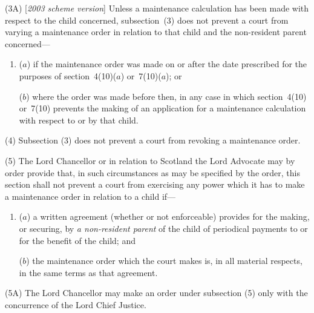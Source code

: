 \documentclass[12pt,a4paper]{article}
\begin{document}
(3A) [\emph{2003 scheme version}] Unless a maintenance calculation has been made with respect to the child concerned, subsection~(3)  does not prevent a court from varying a maintenance order in relation to that child and the non-resident parent concerned—
\begin{enumerate}\item[]
($a$) if the maintenance order was made on or after the date prescribed for the purposes of section~4(10)($a$)  or~7(10)($a$); or

($b$) where the order was made before then, in any case in which section~4(10)  or~7(10)  prevents the making of an application for a maintenance calculation with respect to or by that child.
\end{enumerate}

(4) Subsection (3)  does not prevent a court from revoking a maintenance order.

(5) The Lord Chancellor or in relation to Scotland the Lord Advocate may by order provide that, in such circumstances as may be specified by the order, this section shall not prevent a court from exercising any power which it has to make a maintenance order in relation to a child if—
\begin{enumerate}\item[]
($a$) a written agreement (whether or not enforceable) provides for the making, or securing, by 
\emph{a non-resident parent}  %
of the child of periodical payments to or for the benefit of the child; and

($b$) the maintenance order which the court makes is, in all material respects, in the same terms as that agreement.
\end{enumerate}

(5A) The Lord Chancellor may make an order under subsection (5) only with the concurrence of the Lord Chief Justice.
\end{document}
